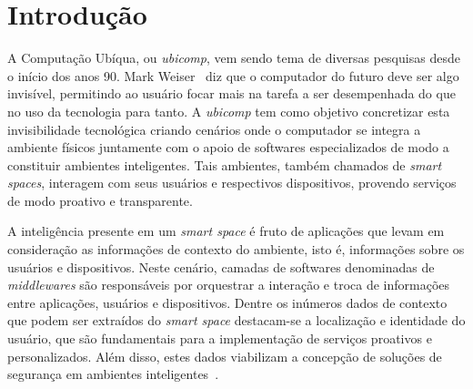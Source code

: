 \chapter{Introdução}

	
A Computação Ubíqua, ou \textit{ubicomp}, vem sendo tema de diversas
pesquisas desde o início dos anos 90. Mark Weiser~\cite{weiser1, weiser2} diz que o computador do futuro deve ser
algo invisível, permitindo ao usuário focar mais na tarefa a ser desempenhada do que no uso da tecnologia para tanto.
A \textit{ubicomp} tem como objetivo concretizar esta invisibilidade tecnológica criando cenários onde o computador se integra a ambiente físicos juntamente com o apoio de softwares especializados de modo a constituir ambientes inteligentes. Tais ambientes, também chamados de \textit{smart spaces}, interagem com seus usuários e respectivos dispositivos, provendo serviços de modo proativo e transparente.

	
A inteligência presente em um \textit{smart space} é fruto de aplicações que levam em consideração as informações de contexto do ambiente, isto é, informações sobre os usuários e dispositivos. Neste cenário, camadas de softwares denominadas de \textit{middlewares} são responsáveis por orquestrar a interação e troca de informações entre aplicações, usuários e dispositivos. Dentre os inúmeros dados de contexto que podem ser extraídos do \textit{smart space} destacam-se a localização e identidade do usuário, que são fundamentais para a implementação de serviços proativos e personalizados. Além disso, estes dados viabilizam a concepção de soluções de segurança em ambientes inteligentes~\cite{saocarlos}.


	
